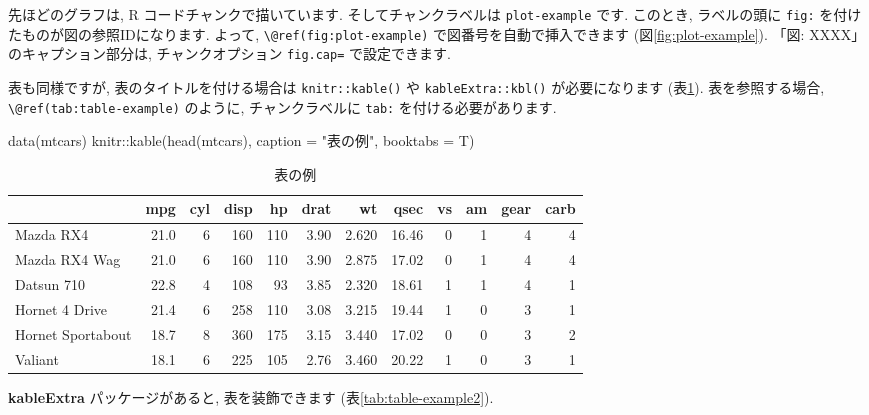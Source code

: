 \documentclass[
]{ltjsarticle}
\newenvironment{Shaded}{\begin{snugshade}}{\end{snugshade}}
\newcommand{\AttributeTok}[1]{\textcolor[rgb]{0.77,0.63,0.00}{#1}}
\newcommand{\FunctionTok}[1]{\textcolor[rgb]{0.00,0.00,0.00}{#1}}
\newcommand{\NormalTok}[1]{#1}
\newcommand{\SpecialCharTok}[1]{\textcolor[rgb]{0.00,0.00,0.00}{#1}}
\newcommand{\StringTok}[1]{\textcolor[rgb]{0.31,0.60,0.02}{#1}}
\begin{document}
先ほどのグラフは, R コードチャンクで描いています. そしてチャンクラベルは \texttt{plot-example} です. このとき, ラベルの頭に \texttt{fig:} を付けたものが図の参照IDになります. よって, \texttt{\textbackslash{}@ref(fig:plot-example)} で図番号を自動で挿入できます (図\ref{fig:plot-example}). 「図: XXXX」のキャプション部分は, チャンクオプション \texttt{fig.cap=} で設定できます.

表も同様ですが, 表のタイトルを付ける場合は \texttt{knitr::kable()} や \texttt{kableExtra::kbl()} が必要になります (表\ref{tab:table-example}). 表を参照する場合, \texttt{\textbackslash{}@ref(tab:table-example)} のように, チャンクラベルに \texttt{tab:} を付ける必要があります.

\begin{Shaded}
\begin{Highlighting}[numbers=left,,]
\FunctionTok{data}\NormalTok{(mtcars)}
\NormalTok{knitr}\SpecialCharTok{::}\FunctionTok{kable}\NormalTok{(}\FunctionTok{head}\NormalTok{(mtcars), }\AttributeTok{caption =} \StringTok{"表の例"}\NormalTok{, }\AttributeTok{booktabs =}\NormalTok{ T)}
\end{Highlighting}
\end{Shaded}

\begin{table}

\caption{\label{tab:table-example}表の例}
\centering
\begin{tabular}[t]{lrrrrrrrrrrr}
\toprule
  & mpg & cyl & disp & hp & drat & wt & qsec & vs & am & gear & carb\\
\midrule
Mazda RX4 & 21.0 & 6 & 160 & 110 & 3.90 & 2.620 & 16.46 & 0 & 1 & 4 & 4\\
Mazda RX4 Wag & 21.0 & 6 & 160 & 110 & 3.90 & 2.875 & 17.02 & 0 & 1 & 4 & 4\\
Datsun 710 & 22.8 & 4 & 108 & 93 & 3.85 & 2.320 & 18.61 & 1 & 1 & 4 & 1\\
Hornet 4 Drive & 21.4 & 6 & 258 & 110 & 3.08 & 3.215 & 19.44 & 1 & 0 & 3 & 1\\
Hornet Sportabout & 18.7 & 8 & 360 & 175 & 3.15 & 3.440 & 17.02 & 0 & 0 & 3 & 2\\
\addlinespace
Valiant & 18.1 & 6 & 225 & 105 & 2.76 & 3.460 & 20.22 & 1 & 0 & 3 & 1\\
\bottomrule
\end{tabular}
\end{table}

\textbf{kableExtra} パッケージがあると, 表を装飾できます (表\ref{tab:table-example2}).
\end{document}
